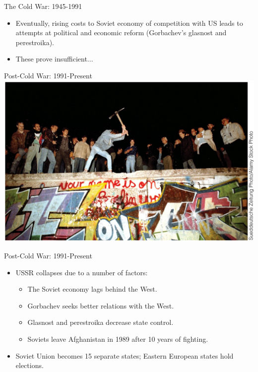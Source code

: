 \documentclass[handout]{beamer}
\begin{document}
\begin{frame}{\LARGE The Cold War: 1945-1991}
	\begin{itemize}
		\item Eventually, rising costs to Soviet economy of competition with US leads to attempts at political and economic reform (Gorbachev's glasnost and perestroika).
		\item These prove insufficient...		
	\end{itemize}
\end{frame}

\begin{frame}{\LARGE Post-Cold War: 1991-Present}
\centering
\includegraphics[width=\textwidth,height=.9\textheight,keepaspectratio]{Berlinwall.jpg}
\end{frame}

\begin{frame}{\LARGE Post-Cold War: 1991-Present}
	\begin{itemize}
		\item USSR collapses due to a number of factors:
		\begin{itemize}
			\item The Soviet economy lags behind the West.
			\item Gorbachev seeks better relations with the West.
			\item Glasnost and perestroika decrease state control.
			\item Soviets leave Afghanistan in 1989 after 10 years of fighting.
		\end{itemize}
		\item Soviet Union becomes 15 separate states; Eastern European states hold elections.
	\end{itemize}
\end{frame}
\end{document}

